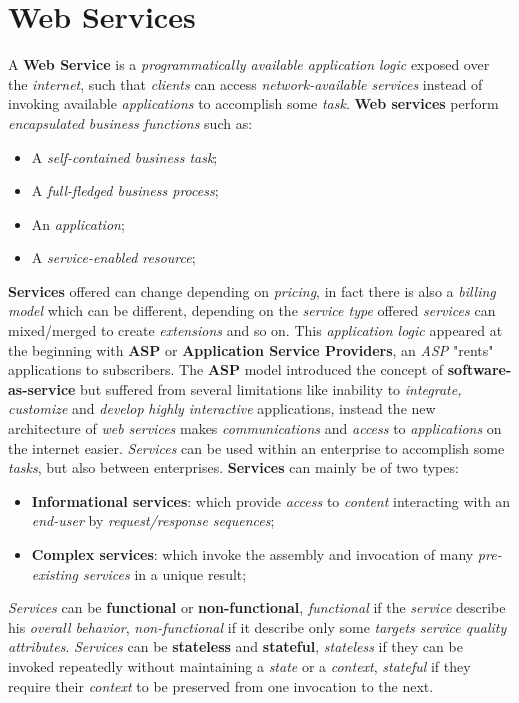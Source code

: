 \documentclass{article}
\begin{document}
\section{Web Services}
A \textbf{Web Service} is a \emph{programmatically available application logic} exposed over the \emph{internet}, such that \emph{clients} can access \emph{network-available services} instead of invoking available \emph{applications} to accomplish some \emph{task}. \textbf{Web services} perform \emph{encapsulated business functions} such as:
\begin{itemize}
\item A \emph{self-contained business task};
\item A \emph{full-fledged business process};
\item An \emph{application};
\item A \emph{service-enabled resource};
\end{itemize}
\textbf{Services} offered can change depending on \emph{pricing}, in fact there is also a \emph{billing model} which can be different, depending on the \emph{service type} offered \emph{services} can mixed/merged to create \emph{extensions} and so on. This \emph{application logic} appeared at the beginning with \textbf{ASP} or \textbf{Application Service Providers}, an \emph{ASP} "rents" applications to subscribers. The \textbf{ASP} model introduced the concept of \textbf{software-as-service} but suffered from several limitations like inability to \emph{integrate, customize} and \emph{develop} \emph{highly interactive} applications, instead the new architecture of \emph{web services} makes \emph{communications} and \emph{access} to \emph{applications} on the internet easier. \emph{Services} can be used within an enterprise to accomplish some \emph{tasks}, but also between enterprises. \textbf{Services} can mainly be of two types:
\begin{itemize}
\item \textbf{Informational services}: which provide \emph{access} to \emph{content} interacting with an \emph{end-user} by \emph{request/response sequences};
\item \textbf{Complex services}: which invoke the assembly and invocation of many \emph{pre-existing services} in a unique result;
\end{itemize}
\emph{Services} can be \textbf{functional} or \textbf{non-functional}, \emph{functional} if the \emph{service} describe his \emph{overall behavior}, \emph{non-functional} if it describe only some \emph{targets service quality attributes}. \emph{Services} can be \textbf{stateless} and \textbf{stateful}, \emph{stateless} if they can be invoked repeatedly without maintaining a \emph{state} or a \emph{context}, \emph{stateful} if they require their \emph{context} to be preserved from one invocation to the next. \\\\
\end{document}
